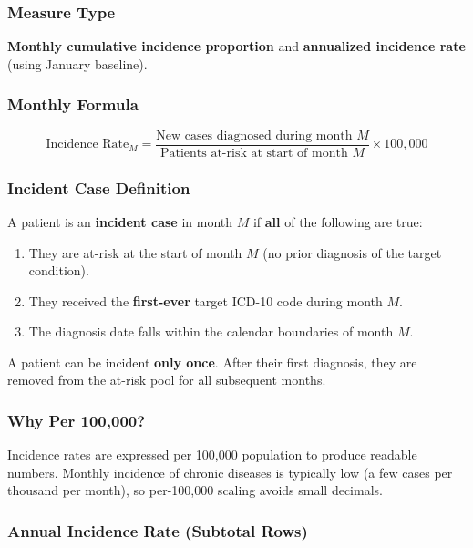 \documentclass[11pt,a4paper]{article}
\begin{document}
\subsubsection{Measure Type}
\textbf{Monthly cumulative incidence proportion} and \textbf{annualized incidence rate} (using January baseline).

\subsubsection{Monthly Formula}

\begin{equation}
\text{Incidence Rate}_{M} =
\frac{\text{New cases diagnosed during month } M}
     {\text{Patients at-risk at start of month } M} \times 100{,}000
\end{equation}

\subsubsection{Incident Case Definition}

A patient is an \textbf{incident case} in month $M$ if \textbf{all} of the following are true:
\begin{enumerate}[leftmargin=*]
    \item They are at-risk at the start of month $M$ (no prior diagnosis of the target condition).
    \item They received the \textbf{first-ever} target ICD-10 code during month $M$.
    \item The diagnosis date falls within the calendar boundaries of month $M$.
\end{enumerate}

A patient can be incident \textbf{only once}. After their first diagnosis, they are removed from the at-risk pool for all subsequent months.

\subsubsection{Why Per 100,000?}

Incidence rates are expressed per 100,000 population to produce readable numbers. Monthly incidence of chronic diseases is typically low (a few cases per thousand per month), so per-100,000 scaling avoids small decimals.

\subsubsection{Annual Incidence Rate (Subtotal Rows)}
\end{document}
